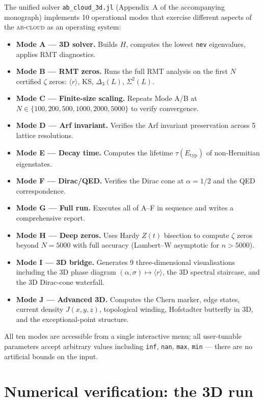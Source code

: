 \documentclass[11pt,a4paper]{article}
\theoremstyle{plain}
\theoremstyle{definition}
\theoremstyle{remark}
\newcommand{\rh}{\langle r\rangle}
\newcommand{\Abcloud}{\textsc{ab-cloud}}
\begin{document}
The unified solver \texttt{ab\_cloud\_3d.jl} (Appendix~A of the accompanying monograph) implements 10 operational modes that exercise different aspects of the \Abcloud{} as an operating system:
\begin{itemize}[leftmargin=*,itemsep=1pt]
    \item \textbf{Mode A — 3D solver.} Builds $H$, computes the lowest \texttt{nev} eigenvalues, applies RMT diagnostics.
    \item \textbf{Mode B — RMT zeros.} Runs the full RMT analysis on the first $N$ certified $\zeta$ zeros: $\rh$, KS, $\Delta_3(L)$, $\Sigma^2(L)$.
    \item \textbf{Mode C — Finite-size scaling.} Repeats Mode A/B at $N\in\{100,200,500,1000,2000,5000\}$ to verify convergence.
    \item \textbf{Mode D — Arf invariant.} Verifies the Arf invariant preservation across 5 lattice resolutions.
    \item \textbf{Mode E — Decay time.} Computes the lifetime $\tau(E_{\mathrm{typ}})$ of non-Hermitian eigenstates.
    \item \textbf{Mode F — Dirac/QED.} Verifies the Dirac cone at $\alpha = 1/2$ and the QED correspondence.
    \item \textbf{Mode G — Full run.} Executes all of A--F in sequence and writes a comprehensive report.
    \item \textbf{Mode H — Deep zeros.} Uses Hardy $Z(t)$ bisection to compute $\zeta$ zeros beyond $N = 5000$ with full accuracy (Lambert--W asymptotic for $n > 5000$).
    \item \textbf{Mode I — 3D bridge.} Generates 9 three-dimensional visualisations including the 3D phase diagram $(\alpha,\sigma)\mapsto\rh$, the 3D spectral staircase, and the 3D Dirac-cone waterfall.
    \item \textbf{Mode J — Advanced 3D.} Computes the Chern marker, edge states, current density $J(x,y,z)$, topological winding, Hofstadter butterfly in 3D, and the exceptional-point structure.
\end{itemize}
All ten modes are accessible from a single interactive menu; all user-tunable parameters accept arbitrary values including \texttt{inf}, \texttt{nan}, \texttt{max}, \texttt{min} — there are no artificial bounds on the input.

\section{Numerical verification: the 3D run}\label{sec:results}
\end{document}
